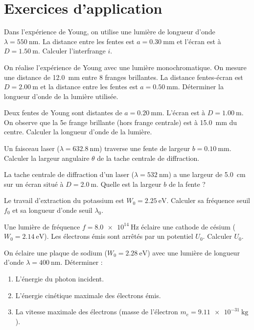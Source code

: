 \section{Exercices d'application}


\exo{}
Dans l'expérience de Young, on utilise une lumière de longueur d'onde \(\lambda = \SI{550}{\nano\metre}\). La distance entre les fentes est \(a = \SI{0.30}{\milli\metre}\) et l'écran est à \(D = \SI{1.50}{\metre}\). Calculer l'interfrange \(i\).

\exo{}
On réalise l'expérience de Young avec une lumière monochromatique. On mesure une distance de \SI{12.0}{\milli\metre} entre 8 franges brillantes. La distance fentes-écran est \(D = \SI{2.00}{\metre}\) et la distance entre les fentes est \(a = \SI{0.50}{\milli\metre}\). Déterminer la longueur d'onde de la lumière utilisée.

\exo{}
Deux fentes de Young sont distantes de \(a = \SI{0.20}{\milli\metre}\). L'écran est à \(D = \SI{1.00}{\metre}\). On observe que la 5e frange brillante (hors frange centrale) est à \SI{15.0}{\milli\metre} du centre. Calculer la longueur d'onde de la lumière.


\exo{}
Un faisceau laser (\(\lambda = \SI{632.8}{\nano\metre}\)) traverse une fente de largeur \(b = \SI{0.10}{\milli\metre}\). Calculer la largeur angulaire \(\theta\) de la tache centrale de diffraction.

\exo{}
La tache centrale de diffraction d'un laser (\(\lambda = \SI{532}{\nano\metre}\)) a une largeur de \SI{5.0}{\centi\metre} sur un écran situé à \(D = \SI{2.0}{\metre}\). Quelle est la largeur \(b\) de la fente ?


\exo{}
Le travail d'extraction du potassium est \(W_0 = \SI{2.25}{\electronvolt}\). Calculer sa fréquence seuil \(f_0\) et sa longueur d'onde seuil \(\lambda_0\).

\exo{}
Une lumière de fréquence \(f = \SI{8.0e14}{\hertz}\) éclaire une cathode de césium (\(W_0 = \SI{2.14}{\electronvolt}\)). Les électrons émis sont arrêtés par un potentiel \(U_0\). Calculer \(U_0\).

\exo{}
On éclaire une plaque de sodium (\(W_0 = \SI{2.28}{\electronvolt}\)) avec une lumière de longueur d'onde \(\lambda = \SI{400}{\nano\metre}\). Déterminer :
\begin{enumerate}
  \item L'énergie du photon incident.
  \item L'énergie cinétique maximale des électrons émis.
  \item La vitesse maximale des électrons (masse de l'électron \(m_e = \SI{9.11e-31}{\kilogram}\)).
\end{enumerate}

